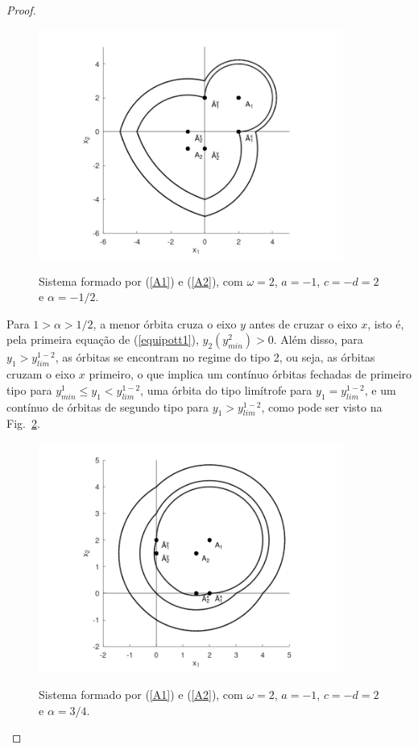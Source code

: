 \begin{proof}
\begin{figure}[H]
\centering
\includegraphics[width=10cm]{circ_bef}\\
\caption{\label{circ_bef}Sistema formado por (\ref{A1}) e (\ref{A2}), com $\omega=2$, $a=-1$, $c=-d=2$ e $\alpha=-1/2$.}
\end{figure}

Para $1>\alpha>1/2$, a menor órbita cruza o eixo $y$ antes de cruzar o eixo $x$, isto é, pela primeira equação de (\ref{equipott1}), $y_2(y_{min}^2)>0$. Além disso, para $y_1>y_{lim}^{1-2}$, as órbitas se encontram no regime do tipo 2, ou seja, as órbitas cruzam o eixo $x$ primeiro, o que implica um contínuo órbitas fechadas de primeiro tipo para $y_{min}^1\leq y_1<y_{lim}^{1-2}$, uma órbita do tipo limítrofe para $y_1=y_{lim}^{1-2}$, e um contínuo de órbitas de segundo tipo para $y_1>y_{lim}^{1-2}$,
como pode ser visto na Fig.~\ref{circ_aft}.

\begin{figure}[H]
\centering
\includegraphics[width=10cm]{circ_aft}\\
\caption{\label{circ_aft}Sistema formado por (\ref{A1}) e (\ref{A2}), com $\omega=2$, $a=-1$, $c=-d=2$ e $\alpha=3/4$.}
\end{figure}


\end{proof}
